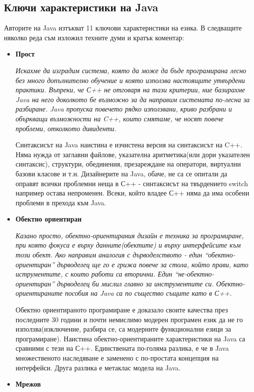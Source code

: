 \subsection{Ключи характеристики на Java}
Авторите на Java изтъкват 11 ключови характеристики на езика. В
следващите няколко реда съм изложил техните думи и кратък коментар:
\begin{itemize}
\item \textbf{Прост}
 
  \emph{Искахме да изградим система, която да може да бъде програмирана
    лесно без много допълнително обучение и която използва настоящите
    утвърдени практики. Въпреки, че С++ не отговаря на тази критерии,
    ние базирахме Java на него доколкото бе възможно за да направим
    системата по-лесна за разбиране. Java пропуска повечето рядко
    използвани, криво разбрани и объркващи възможности на C++, които
    смятаме, че носят повече проблеми, отколкото дивиденти.}

  Синтаксисът на Java наистина е изчистена версия на синтаксисът на
  C++. Няма нужда от заглавни файлове, указателна аритметика(или дори
  указателен синтаксис), структури, обединения, презареждане на
  оператори, виртуални базови класове и т.н. Дизайнерите на Java,
  обаче, не са се опитали да оправят всички проблемни неща в С++ -
  синтаксисът на твърдението switch например остава непроменен. Всеки,
  който владее С++ няма да има особени проблеми в прехода към Java.
\item \textbf{Обектно ориентиран}

    \emph{Казано просто, обектно-ориентирания дизайн е техника за
    програмиране, при която фокуса е върху данните(обектите) и върху
    интерфейсите към този обект. Ако направим аналогия с
    дърводелството - един "`обектно-ориентиран"' дърводелец ще го е
    грижа повече за стола, който прави, като иструментите, с които
    работи са вторични. Един "`не-обектно-ориентиран"' дърводелец би
    мислил главно за инструментите си. Обектно-ориентираните пособия
    на Java са по същество същите като в С++.}

  Обектно ориентираното програмиране е доказало своите качества през
  последните 30 години и почти немислимо модерен програмен език да не
  го използва(изключение, разбира се, са модерните функционални езици
  за програмиране). Наистина обектно-ориентираните характеристики на
  Java са сравними с тези на С++. Единствената по-голяма разлика, е че
  в Java множественото наследяване е заменено с по-простата концепция
  на интерфейси. Друга разлика е метаклас модела на Java.
  \item \textbf{Мрежов}


\end{itemize}
